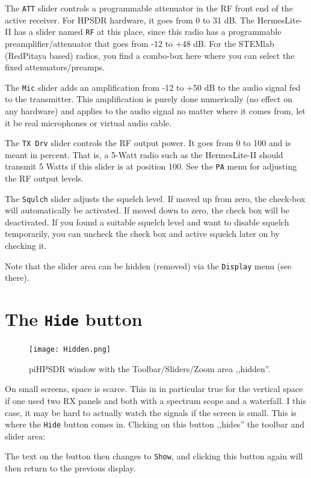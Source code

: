 \documentclass[12pt]{book}
\def\rett#1{\texttt{\color{red}#1}}
\def\bltt#1{\texttt{\color{blue}#1}}
\def\pH{pi\-HPSDR\xspace}
\begin{document}
The \rett{ATT} slider controls a programmable attenuator in the RF front end of the active receiver. For
HPSDR hardware, it goes from 0 to 31 dB. The HermesLite-II has a slider named \rett{RF} at this place,
since this radio has a programmable preamplifier/attenuator that goes from -12 to +48 dB. For the STEMlab
(RedPitaya based) radios, you find a combo-box here where you can select the fixed attenuators/preamps.

The \rett{Mic} slider adds an amplification from -12 to +50 dB to the audio signal fed to the transmitter.
This amplification is purely done numerically (no effect on any hardware) and applies to the audio signal
no matter where it comes from, let it be real microphones or virtual audio cable.

The \rett{TX Drv} slider controls the RF output power. It goes from 0 to 100 and is meant in percent. That is,
a 5-Watt radio such as the HermesLite-II should transmit 5 Watts if this slider is at position 100. See the
\bltt{PA} menu for adjusting the RF output levels.

The \rett{Squlch} slider adjusts the squelch level. If moved up from zero, the check-box will automatically
be activated. If moved down to zero, the check box will be deactivated. If you found a suitable squelch
level and want to disable squelch temporarily, you can uncheck the check box and active squelch later
on by checking it.

Note that the slider area can be hidden (removed) via the \bltt{Display} menu (see there).
\section{The \texttt{Hide} button}
\begin{figure}[ht]
\center
\texttt{[image: Hidden.png]}
\caption{\pH window with the Toolbar/Sliders/Zoom
area ,,hidden''.}
\end{figure}

On small screens, space is scarce. This in in particular true
for the vertical space if one used two RX panels and both
with a spectrum scope and a waterfall. I this case, it may be
hard to actually watch the signals if the screen is small.
This is where the \rett{Hide} button comes in. Clicking on
this button ,,hides'' the toolbar and slider area:


The text on the button then changes to \rett{Show}, and
clicking this button again will then return to the
previous display.
\end{document}
